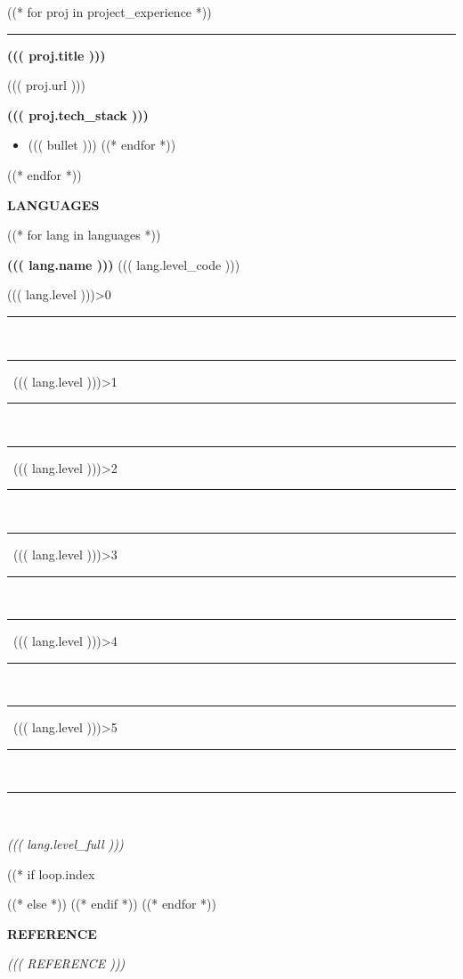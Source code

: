 \documentclass[11pt, a4paper]{article}
\newcommand{\cvsection}[1]{%
  \vspace{6pt}%
  \noindent%
  \colorbox{DKGreen}{\hspace{4pt}\rule{0pt}{14pt}\hspace{4pt}}%
  \colorbox{CardBG}{%
    \parbox[c][14pt]{\dimexpr\linewidth-16pt\relax}{%
      \hspace{8pt}\textcolor{DKGreen}{\textbf{\large\MakeUppercase{#1}}}%
    }%
  }%
  \par
  \noindent{\color{BorderClr}\rule{\linewidth}{0.6pt}}%
  \vspace{4pt}\par\noindent%
}
\newcommand{\sqon}{\textcolor{DKGreen}{\rule{8pt}{8pt}}\,}
\newcommand{\sqoff}{\textcolor{BorderClr}{\rule{8pt}{8pt}}\,}
\newcommand{\langbar}[1]{%
  \ifnum#1>0\sqon\else\sqoff\fi%
  \ifnum#1>1\sqon\else\sqoff\fi%
  \ifnum#1>2\sqon\else\sqoff\fi%
  \ifnum#1>3\sqon\else\sqoff\fi%
  \ifnum#1>4\sqon\else\sqoff\fi%
  \ifnum#1>5\sqon\else\sqoff\fi%
}
\begin{document}
((* for proj in project_experience *))
\vspace{8pt}
\noindent%
{\color{DKGreen}\rule{4pt}{14pt}}\hspace{6pt}%
\textcolor{DarkTxt}{\textbf{\large ((( proj.title )))}}\par
\vspace{1pt}
\noindent\hspace{10pt}\textcolor{MDGreen}{\small ((( proj.url )))}\par
\vspace{1pt}
\noindent\hspace{10pt}\textcolor{DKGreen}{\textbf{\small ((( proj.tech_stack )))}}
\vspace{2pt}
\begin{itemize}
((* for bullet in proj.bullets *))
  \item \textcolor{MidTxt}{((( bullet )))}
((* endfor *))
\end{itemize}
\vspace{2pt}
((* endfor *))

\newpage

\cvsection{Languages}

\vspace{4pt}
\noindent
((* for lang in languages *))%
\begin{minipage}[t]{0.30\linewidth}
\noindent\textcolor{DKGreen}{\textbf{((( lang.name )))}}%
\hfill\textcolor{LiteTxt}{\small ((( lang.level_code )))}\par
\vspace{2pt}%
\langbar{((( lang.level )))}\par
\vspace{1pt}%
\textcolor{LiteTxt}{\textit{\small ((( lang.level_full )))}}

\end{minipage}%
((* if loop.index %
\par\vspace{6pt}\noindent
((* else *))
\hfill
((* endif *))
((* endfor *))

\cvsection{Reference}

\vspace{4pt}
\noindent\textcolor{LiteTxt}{\textit{((( REFERENCE )))}}
\end{document}
